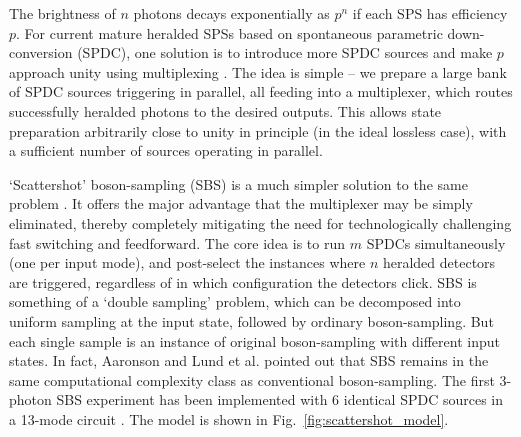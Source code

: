 \documentclass[aps,rmp,twocolumn,amsmath,amssymb,nofootinbib,superscriptaddress]{revtex4}
\begin{document}
The brightness of $n$ photons decays exponentially as $p^n$ if each SPS has efficiency $p$. For current mature heralded SPSs based on spontaneous parametric down-conversion (SPDC), one solution is to introduce more SPDC sources and make $p$ approach unity using multiplexing \cite{bib:34}. The idea is simple -- we prepare a large bank of SPDC sources triggering in parallel, all feeding into a multiplexer, which routes successfully heralded photons to the desired outputs. This allows state preparation arbitrarily close to unity in principle (in the ideal lossless case), with a sufficient number of sources operating in parallel.

`Scattershot' boson-sampling (SBS) is a much simpler solution to the same problem \cite{bib:35, bib:36}. It offers the major advantage that the multiplexer may be simply eliminated, thereby completely mitigating the need for technologically challenging fast switching and feedforward. The core idea is to run $m$ SPDCs simultaneously (one per input mode), and post-select the instances where $n$ heralded detectors are triggered, regardless of in which configuration the detectors click. SBS is something of a `double sampling' problem, which can be decomposed into uniform sampling at the input state, followed by ordinary boson-sampling. But each single sample is an instance of original boson-sampling with different input states. In fact, Aaronson \cite{bib:35} and Lund et al. \cite{bib:36} pointed out that SBS remains in the same computational complexity class as conventional boson-sampling. The first 3-photon SBS experiment has been implemented with 6 identical SPDC sources in a 13-mode circuit \cite{bib:38}. The model is shown in Fig.~\ref{fig:scattershot_model}.
\end{document}
